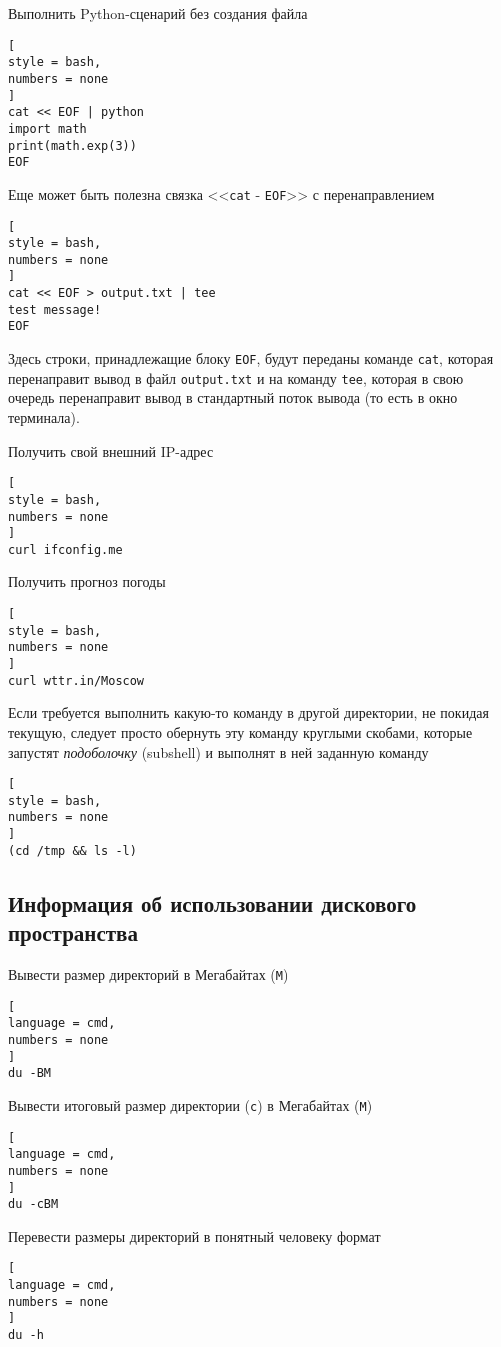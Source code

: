 \documentclass[%
	11pt,
	a4paper,
	utf8,
		]{article}
\begin{document}
Выполнить Python-сценарий без создания файла
\begin{lstlisting}[
style = bash,
numbers = none
]
cat << EOF | python
import math
print(math.exp(3))
EOF
\end{lstlisting}

Еще может быть полезна связка <<\texttt{cat} - \texttt{EOF}>> с перенаправлением
\begin{lstlisting}[
style = bash,
numbers = none	
]
cat << EOF > output.txt | tee
test message!
EOF
\end{lstlisting}
Здесь строки, принадлежащие блоку \texttt{EOF}, будут переданы команде \texttt{cat}, которая перенаправит вывод в файл \texttt{output.txt} и на команду \texttt{tee}, которая в свою очередь перенаправит вывод в стандартный поток вывода (то есть в окно терминала).

Получить свой внешний IP-адрес
\begin{lstlisting}[
style = bash,
numbers = none	
]
curl ifconfig.me
\end{lstlisting}

Получить прогноз погоды
\begin{lstlisting}[
style = bash,
numbers = none	
]
curl wttr.in/Moscow
\end{lstlisting}

Если требуется выполнить какую-то команду в другой директории, не покидая текущую, следует просто обернуть эту команду круглыми скобами, которые запустят \emph{подоболочку} (subshell) и выполнят в ней заданную команду
\begin{lstlisting}[
style = bash,
numbers = none	
]
(cd /tmp && ls -l)
\end{lstlisting}


\subsection{Информация об использовании дискового пространства}

Вывести размер директорий в Мегабайтах (\texttt{M})
\begin{lstlisting}[
language = cmd,
numbers = none
]
du -BM
\end{lstlisting}

Вывести итоговый размер директории (\texttt{c}) в Мегабайтах (\texttt{M})
\begin{lstlisting}[
language = cmd,
numbers = none
]
du -cBM
\end{lstlisting}

Перевести размеры директорий в понятный человеку формат
\begin{lstlisting}[
language = cmd,
numbers = none
]
du -h
\end{lstlisting}
\end{document}
